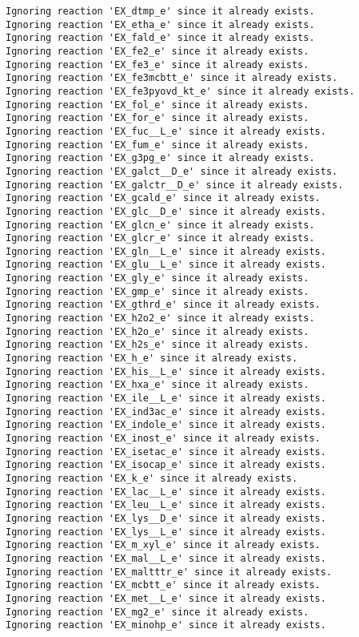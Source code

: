 \documentclass[
  letterpaper,
  DIV=11,
  numbers=noendperiod]{scrartcl}
\begin{document}
\begin{verbatim}
Ignoring reaction 'EX_dtmp_e' since it already exists.
Ignoring reaction 'EX_etha_e' since it already exists.
Ignoring reaction 'EX_fald_e' since it already exists.
Ignoring reaction 'EX_fe2_e' since it already exists.
Ignoring reaction 'EX_fe3_e' since it already exists.
Ignoring reaction 'EX_fe3mcbtt_e' since it already exists.
Ignoring reaction 'EX_fe3pyovd_kt_e' since it already exists.
Ignoring reaction 'EX_fol_e' since it already exists.
Ignoring reaction 'EX_for_e' since it already exists.
Ignoring reaction 'EX_fuc__L_e' since it already exists.
Ignoring reaction 'EX_fum_e' since it already exists.
Ignoring reaction 'EX_g3pg_e' since it already exists.
Ignoring reaction 'EX_galct__D_e' since it already exists.
Ignoring reaction 'EX_galctr__D_e' since it already exists.
Ignoring reaction 'EX_gcald_e' since it already exists.
Ignoring reaction 'EX_glc__D_e' since it already exists.
Ignoring reaction 'EX_glcn_e' since it already exists.
Ignoring reaction 'EX_glcr_e' since it already exists.
Ignoring reaction 'EX_gln__L_e' since it already exists.
Ignoring reaction 'EX_glu__L_e' since it already exists.
Ignoring reaction 'EX_gly_e' since it already exists.
Ignoring reaction 'EX_gmp_e' since it already exists.
Ignoring reaction 'EX_gthrd_e' since it already exists.
Ignoring reaction 'EX_h2o2_e' since it already exists.
Ignoring reaction 'EX_h2o_e' since it already exists.
Ignoring reaction 'EX_h2s_e' since it already exists.
Ignoring reaction 'EX_h_e' since it already exists.
Ignoring reaction 'EX_his__L_e' since it already exists.
Ignoring reaction 'EX_hxa_e' since it already exists.
Ignoring reaction 'EX_ile__L_e' since it already exists.
Ignoring reaction 'EX_ind3ac_e' since it already exists.
Ignoring reaction 'EX_indole_e' since it already exists.
Ignoring reaction 'EX_inost_e' since it already exists.
Ignoring reaction 'EX_isetac_e' since it already exists.
Ignoring reaction 'EX_isocap_e' since it already exists.
Ignoring reaction 'EX_k_e' since it already exists.
Ignoring reaction 'EX_lac__L_e' since it already exists.
Ignoring reaction 'EX_leu__L_e' since it already exists.
Ignoring reaction 'EX_lys__D_e' since it already exists.
Ignoring reaction 'EX_lys__L_e' since it already exists.
Ignoring reaction 'EX_m_xyl_e' since it already exists.
Ignoring reaction 'EX_mal__L_e' since it already exists.
Ignoring reaction 'EX_maltttr_e' since it already exists.
Ignoring reaction 'EX_mcbtt_e' since it already exists.
Ignoring reaction 'EX_met__L_e' since it already exists.
Ignoring reaction 'EX_mg2_e' since it already exists.
Ignoring reaction 'EX_minohp_e' since it already exists.

\end{verbatim}
\end{document}
